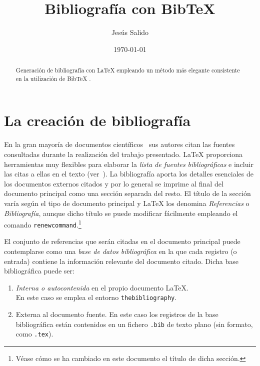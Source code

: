 \documentclass[11pt,a4paper]{article}
\author{Jesús Salido}
\title{Bibliografía con Bib\TeX{}}
\date{\today}
\begin{document}
\maketitle


\begin{abstract}
Generación de bibliografía con \LaTeX{} empleando un método más elegante consistente en la utilización de Bib\TeX{} \cite{wikibookLaTex10}.
\end{abstract}

\tableofcontents



\section{La creación de bibliografía}
En la gran mayoría de documentos científicos~\cite[pág. 5]{salido15} sus autores citan las fuentes consultadas durante la realización del trabajo presentado. \LaTeX{} proporciona herramientas muy flexibles para elaborar la \emph{lista de fuentes bibliográficas} e incluir las citas a ellas en el texto (ver~\cite{cascales00,cascales03,goos04,kopka04,lamport94}). La bibliografía aporta los detalles esenciales de los documentos externos citados y por lo general se imprime al final del documento principal como una sección separada del resto. El título de la sección varía según el tipo de documento principal y \LaTeX{} los denomina \emph{Referencias} o \emph{Bibliografía}, aunque dicho título se puede modificar fácilmente empleando el comando \texttt{renewcommand}.\footnote{Véase cómo se ha cambiado en este documento el título de dicha sección.}


El conjunto de referencias que serán citadas en el documento principal puede contemplarse como una \emph{base de datos bibliográfica} en la que cada registro (o entrada) contiene la información relevante del documento citado. Dicha base bibliográfica puede ser:
\begin{enumerate}
	\item \emph{Interna o autocontenida} en el propio documento \LaTeX{}.\\
	 En este caso se emplea el entorno \texttt{thebibliography}.
	
	\item Externa al documento fuente. En este caso los registros de la base bibliográfica están contenidos en un fichero \texttt{.bib} de texto plano (sin formato, como \texttt{.tex}).
\end{enumerate}
\end{document}
